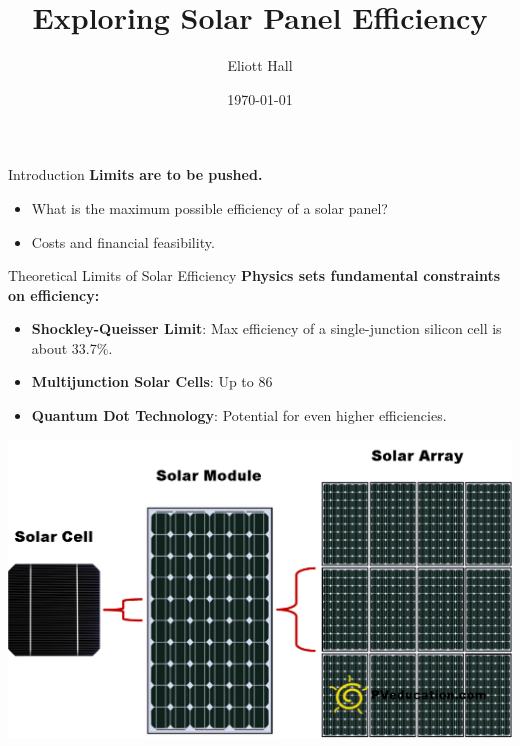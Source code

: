 \documentclass[aspectratio=169]{beamer} %
\title{Exploring Solar Panel Efficiency}
\author{Eliott Hall}
\date{\today}
\begin{document}
\frame{\titlepage}

\begin{frame}{Introduction}
    \textbf{Limits are to be pushed.}
    \begin{itemize}
        \item What is the maximum possible efficiency of a solar panel?
        \item Costs and financial feasibility.
    \end{itemize}
\end{frame}

\begin{frame}{Theoretical Limits of Solar Efficiency}
    \textbf{Physics sets fundamental constraints on efficiency:}
    \begin{itemize}
        \item \textbf{Shockley-Queisser Limit}: Max efficiency of a single-junction silicon cell is about 33.7\%.
        \item \textbf{Multijunction Solar Cells}: Up to 86%
        \item \textbf{Quantum Dot Technology}: Potential for even higher efficiencies.
    \end{itemize}
    \centering
    \includegraphics[width=0.7\linewidth]{solar_cells.png} %
\end{frame}
\end{document}
